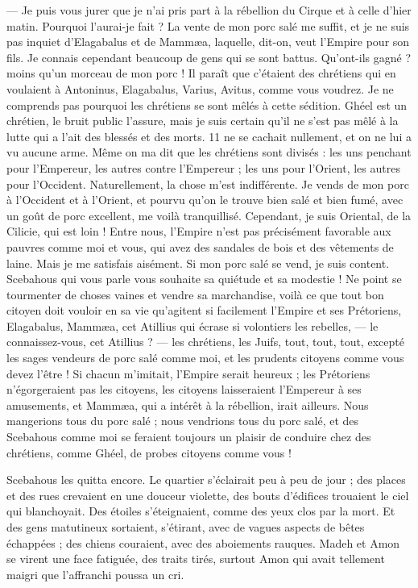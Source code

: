 \documentclass[a4paper, 11pt, oneside, polutonikogreek, french]{article}
\begin{document}
--- Je puis vous jurer que je n'ai pris part à la rébellion du Cirque et à celle d'hier matin. Pourquoi l'aurai-je fait ? La vente de mon porc salé me suffit, et je ne suis pas inquiet d'Elagabalus et de Mammæa, laquelle, dit-on, veut l'Empire pour son fils. Je connais cependant beaucoup de gens qui se sont battus. Qu'ont-ils gagné ? moins qu'un morceau de mon porc ! Il paraît que c'étaient des chrétiens qui en voulaient à Antoninus, Elagabalus, Varius, Avitus, comme vous voudrez. Je ne comprends pas pourquoi les chrétiens se sont mêlés à cette sédition. Ghéel est un chrétien, le bruit public l'assure, mais je suis certain qu'il ne s'est pas mêlé à la lutte qui a l'ait des blessés et des morts. 11 ne se cachait nullement, et on ne lui a vu aucune arme. Même on ma dit que les chrétiens sont divisés : les uns penchant pour l'Empereur, les autres contre l'Empereur ; les uns pour l'Orient, les autres pour l'Occident. Naturellement, la chose m'est indifférente. Je vends de mon porc à l'Occident et à l'Orient, et pourvu qu'on le trouve bien salé et bien fumé, avec un goût de porc excellent, me voilà tranquillisé. Cependant, je suis Oriental, de la Cilicie, qui est loin ! Entre nous, l'Empire n'est pas précisément favorable aux pauvres comme moi et vous, qui avez des sandales de bois et des vêtements de laine. Mais je me satisfais aisément. Si mon porc salé se vend, je suis content. Scebahous qui vous parle vous souhaite sa quiétude et sa modestie ! Ne point se tourmenter de choses vaines et vendre sa marchandise, voilà ce que tout bon citoyen doit vouloir en sa vie qu'agitent si facilement l'Empire et ses Prétoriens, Elagabalus, Mammæa, cet Atillius qui écrase si volontiers les rebelles, --- le connaissez-vous, cet Atillius ? --- les chrétiens, les Juifs, tout, tout, tout, excepté les sages vendeurs de porc salé comme moi, et les prudents citoyens comme vous devez l'être ! Si chacun m'imitait, l'Empire serait heureux ; les Prétoriens n'égorgeraient pas les citoyens, les citoyens laisseraient l'Empereur à ses amusements, et Mammæa, qui a intérêt à la rébellion, irait ailleurs. Nous mangerions tous du porc salé ; nous vendrions tous du porc salé, et des Scebahous comme moi se feraient toujours un plaisir de conduire chez des chrétiens, comme Ghéel, de probes citoyens comme vous !

Scebahous les quitta encore. Le quartier s'éclairait peu à peu de jour ; des places et des rues crevaient en une douceur violette, des bouts d'édifices trouaient le ciel qui blanchoyait. Des étoiles s'éteignaient, comme des yeux clos par la mort. Et des gens matutineux sortaient, s'étirant, avec de vagues aspects de bêtes échappées ; des chiens couraient, avec des aboiements rauques. Madeh et Amon se virent une face fatiguée, des traits tirés, surtout Amon qui avait tellement maigri que l'affranchi poussa un cri.
\end{document}
